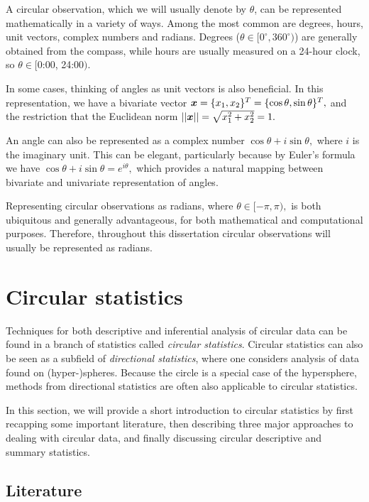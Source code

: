 \documentclass[12pt, a4paper]{book}\usepackage[]{graphicx}\usepackage{xcolor}
\begin{document}
A circular observation, which we will usually denote by $\theta$, can be represented mathematically in a variety of ways. Among the most common are degrees, hours, unit vectors, complex numbers and radians. Degrees ($\theta \in [0^\circ, 360^\circ)$) are generally obtained from the compass, while hours are usually measured on a 24-hour clock, so $\theta \in [$0:00, 24:00$)$.

In some cases, thinking of angles as unit vectors is also beneficial. In this representation, we have a bivariate vector $\boldsymbol{x} = \{x_1, x_2\}^T = \{\cos\theta, \sin\theta\}^T,$ and the restriction that the Euclidean norm $\vert\vert \boldsymbol{x} \vert\vert = \sqrt{x_1^2 + x_2^2} = 1.$

An angle can also be represented as a complex number $\cos\theta + i \sin \theta,$ where $i$ is the imaginary unit. This can be elegant, particularly because by Euler's formula we have $\cos\theta + i \sin \theta = e^{i\theta},$ which provides a natural mapping between bivariate and univariate representation of angles.

Representing circular observations as radians, where $\theta \in [-\pi, \pi),$ is both ubiquitous and generally advantageous, for both mathematical and computational purposes. Therefore, throughout this dissertation circular observations will usually be represented as radians.


\section*{Circular statistics}

Techniques for both descriptive and inferential analysis of circular data can be found in a branch of statistics called \textit{circular statistics}. Circular statistics can also be seen as a subfield of \textit{directional statistics}, where one considers analysis of data found on (hyper-)spheres. Because the circle is a special case of the hypersphere, methods from directional statistics are often also applicable to circular statistics.

In this section, we will provide a short introduction to circular statistics by first recapping some important literature, then describing three major approaches to dealing with circular data, and finally discussing circular descriptive and summary statistics.

\subsection*{Literature}
\end{document}
